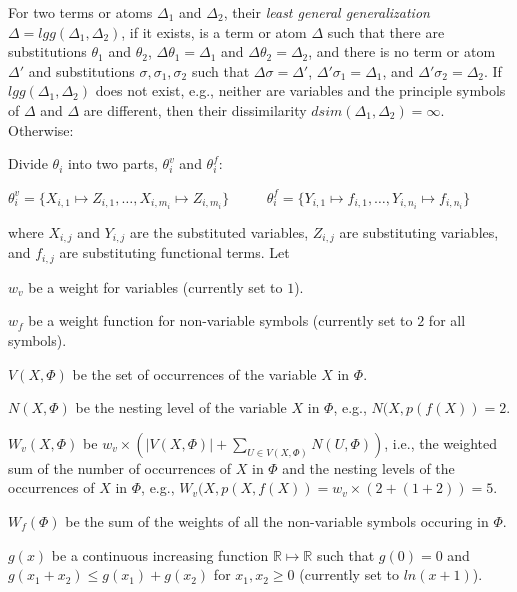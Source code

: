 \documentclass[EPiC]{easychair}
\newenvironment{packed_itemize}{
\vspace*{-0.5em}
\begin{itemize}
  \setlength{\partopsep}{0pt}
  \setlength{\itemsep}{1pt}
  \setlength{\parskip}{0pt}
  \setlength{\parsep}{0pt}
}{\end{itemize}}
\begin{document}
For two terms or atoms $\Delta_1$ and $\Delta_2$, their \emph{least general 
generalization} $\Delta = lgg(\Delta_1,\Delta_2)$, if it exists, is a term 
or atom $\Delta$ such that there are substitutions $\theta_1$ and $\theta_2$, 
$\Delta\theta_1 = \Delta_1$ and $\Delta\theta_2 = \Delta_2$, and 
there is no term or atom $\Delta'$ and substitutions 
$\sigma, \sigma_1, \sigma_2$ such that 
$\Delta\sigma = \Delta'$, $\Delta'\sigma_1 = \Delta_1$, 
and $\Delta'\sigma_2 = \Delta_2$.
If $lgg(\Delta_1,\Delta_2)$ does not exist, e.g., neither are variables and 
the principle symbols of $\Delta$ and $\Delta$ are different, then their 
dissimilarity $dsim(\Delta_1,\Delta_2) = \infty$.
Otherwise:

Divide $\theta_i$ into two parts, $\theta_i^v$ and $\theta_i^f$:
\begin{center}
$\theta_i^v=\{X_{i,1}\mapsto Z_{i,1},\dots,X_{i,m_i}\mapsto Z_{i,m_i}\}$
~~~~
$\theta_i^f=\{Y_{i,1}\mapsto f_{i,1},\dots,Y_{i,n_i}\mapsto f_{i,n_i}\}$
\end{center}
where $X_{i,j}$ and $Y_{i,j}$ are the substituted variables, 
$Z_{i,j}$ are substituting variables, and
$f_{i,j}$ are substituting functional terms.
Let
\begin{packed_itemize}
\item $w_v$ be a weight for variables (currently set to $1$).
\item $w_f$ be a weight function for non-variable symbols (currently
      set to $2$ for all symbols). 
\item $V(X,\Phi)$ be the set of occurrences of the variable $X$ in $\Phi$.
\item $N(X,\Phi)$ be the nesting level of the variable $X$ in $\Phi$, e.g., 
      $N(X,p(f(X)) = 2$.
\item $W_v(X,\Phi)$ be 
      $w_v \times (|V(X,\Phi)| + \sum_{U \in V(X,\Phi)} N(U,\Phi))$,
      i.e., the weighted sum of the number of occurrences of $X$ in $\Phi$ and 
      the nesting levels of the occurrences of $X$ in $\Phi$, e.g., 
      $W_v(X,p(X,f(X)) = w_v \times (2 + (1+2)) = 5$.
\item $W_f(\Phi)$ be the sum of the weights of all the non-variable symbols 
      occuring in $\Phi$.
\item $g(x)$ be a continuous increasing function 
      $\mathbb{R} \mapsto \mathbb{R}$ such that 
      $g(0)=0$
      and
      $g(x_1+x_2) \leq g(x_1)+ g(x_2)$ for $x_1, x_2\geq0$
      (currently set to $ln(x+1)$).
\end{packed_itemize}
\end{document}
